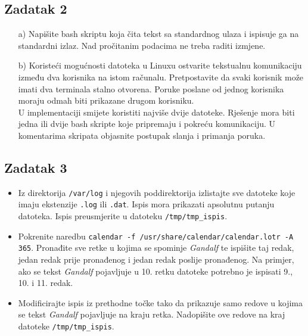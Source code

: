 \documentclass[12pt,a4paper]{article}
\newcommand{\shell}[1]{\texttt{#1}}
\begin{document}
	\subsection*{Zadatak 2}
	\begin{itemize}
		\item[a)] Napišite bash skriptu koja čita tekst sa standardnog ulaza i ispisuje ga na standardni izlaz. Nad pročitanim podacima ne treba raditi izmjene.
		\item[b)] Koristeći mogućnosti datoteka u Linuxu ostvarite tekstualnu komunikaciju između dva korisnika na istom računalu. Pretpostavite da svaki korisnik može imati dva terminala stalno otvorena. Poruke poslane od jednog korisnika moraju odmah biti prikazane drugom korisniku.\\
		U implementaciji smijete koristiti najviše dvije datoteke. Rješenje mora biti jedna ili dvije bash skripte koje pripremaju i pokreću komunikaciju. U komentarima skripata objasnite postupak slanja i primanja poruka.
	\end{itemize}
	\subsection*{Zadatak 3}
	\begin{itemize}
		\item Iz direktorija \shell{/var/log} i njegovih poddirektorija izlistajte sve datoteke koje imaju ekstenzije \shell{.log} ili \shell{.dat}. Ispis mora prikazati apsolutnu putanju datoteka. Ispis preusmjerite u datoteku \shell{/tmp/tmp\_ispis}.
		\item Pokrenite naredbu \shell{calendar -f /usr/share/calendar/calendar.lotr -A 365}. Pronađite sve retke u kojima se spominje \textit{Gandalf} te ispišite taj redak, jedan redak prije pronađenog i jedan redak poslije pronađenog. Na primjer, ako se tekst \textit{Gandalf} pojavljuje u 10. retku datoteke potrebno je ispisati 9., 10. i 11. redak.
		\item Modificirajte ispis iz prethodne točke tako da prikazuje samo redove u kojima se tekst \textit{Gandalf} pojavljuje na kraju retka. Nadopišite ove redove na kraj datoteke \shell{/tmp/tmp\_ispis}.
	\end{itemize}
\end{document}
